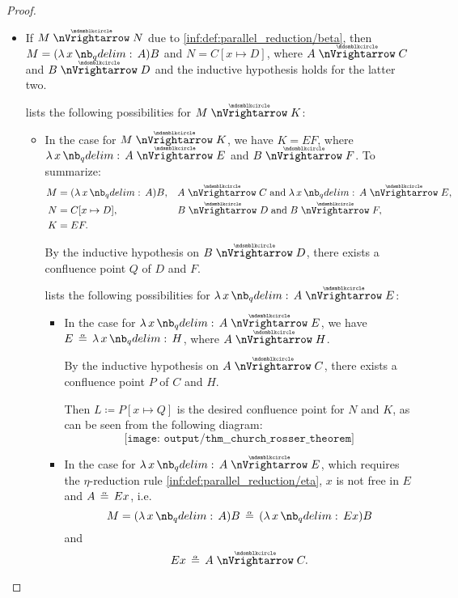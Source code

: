 \begin{proof}
\begin{itemize}
    \item If \( M \ppred N \) due to \ref{inf:def:parallel_reduction/beta}, then \( M = (\qabs x A)B \) and \( N = C[x \mapsto D] \), where \( A \ppred C \) and \( B \ppred D \) and the inductive hypothesis holds for the latter two.

     lists the following possibilities for \( M \ppred K \):
    \begin{itemize}
      \item In the case  for \( M \ppred K \), we have \( K = EF \), where \( \qabs x A \ppred E \) and \( B \ppred F \). To summarize:
      \begin{align*}
        M &= (\qabs x A) B,           &&A \ppred C \T{and} \qabs x A \ppred E, \\
        N &= C[x \mapsto D],          &&B \ppred D \T{and} B \ppred F, \\
        K &= E F.                     &&
      \end{align*}

      By the inductive hypothesis on \( B \ppred D \), there exists a confluence point \( Q \) of \( D \) and \( F \).

       lists the following possibilities for \( \qabs x A \ppred E \):
      \begin{itemize}
        \item In the case  for \( \qabs x A \ppred E \), we have \( E \aequiv \qabs x H \), where \( A \ppred H \).

        By the inductive hypothesis on \( A \ppred C \), there exists a confluence point \( P \) of \( C \) and \( H \).

        Then \( L \coloneqq P[x \mapsto Q] \) is the desired confluence point for \( N \) and \( K \), as can be seen from the following diagram:
        \begin{equation*}
          \texttt{[image: output/thm\_\_church\_rosser\_theorem]}
        \end{equation*}

        \item In the case  for \( \qabs x A \ppred E \), which requires the \( \eta \)-reduction rule \ref{inf:def:parallel_reduction/eta}, \( x \) is not free in \( E \) and \( A \aequiv Ex \), i.e.
        \begin{equation*}
          M = (\qabs x A) B \aequiv (\qabs x E x) B
        \end{equation*}
        and
        \begin{equation*}
          Ex \aequiv A \ppred C.
        \end{equation*}


\end{itemize}
\end{itemize}
\end{itemize}
\end{proof}
